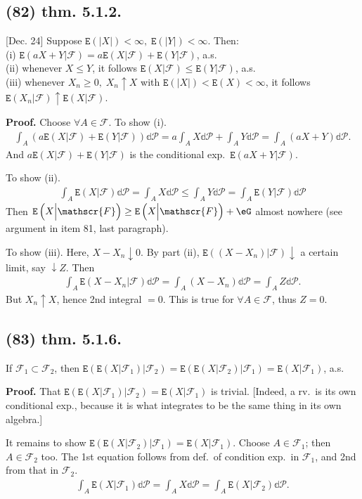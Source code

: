 \documentclass[12pt]{article}
\newcommand{\oo}\infty%
\newcommand{\Ev}\forall%
\newcommand{\dd}{ \BF{d} }%
\newcommand{\Rb}[1]{ \left( #1 \right) }%
\newcommand{\BF}[1]{ \mathbb{#1} }%
\newcommand{\CF}[1]{ \mathcal{#1} }%
\newcommand{\SF}[1]{ \mathscr{#1} }%
\newcommand{\Ss}[1]{\textsf{\bfseries{#1}}}%
\newcommand{\Tw}[1]{\texttt{#1}}%
\newcommand{\EqGo}[1]{ \begin{gather*}{#1}\end{gather*} } %
\newcommand{\E}[1]{ \Tw{E}\Rb{#1} }%
\begin{document}
\subsection*{(82) thm. 5.1.2.} [Dec. 24] Suppose \(\E{|X|} <\oo,\; \E{|Y|} <\oo\). Then: \\
\indent (i) \(\E{aX+Y  \Big| \SF{F}} =a \E{X \Big| \SF{F}} +\E{Y \Big| \SF{F}}\), a.s. \\
\indent (ii) whenever \(X \leq Y\), it follows \(\E{X \Big| \SF{F}} \leq \E{Y \Big| \SF{F}}\), a.s. \\
\indent (iii) whenever \(X_n \geq 0,\; X_n \uparrow X\) with \(\E{|X|} <\E{X} <\oo\), it follows \(\E{X_n \Big| \SF{F}} \uparrow \E{X \Big| \SF{F}}\). \par
\Ss{Proof.} Choose \(\Ev A \in \SF{F}\). To show (i). \EqGo{
 \int_A (a\E{X \Big| \SF{F}} +\E{Y \Big| \SF{F}}) \dd \CF{P}
 =a\int_A X \dd \CF{P} +\int_A Y \dd \CF{P}
 =\int_A (aX +Y) \dd \CF{P}.
} And \(a \E{X \Big| \SF{F}} +\E{Y \Big| \SF{F}}\) is the conditional exp.\ \(\E{aX+Y  \Big| \SF{F}}\). \par
To show (ii). \EqGo{
 \int_A \E{X \Big| \SF{F}} \dd \CF{P}
 =\int_A X \dd \CF{P}
 \leq\int_A Y \dd \CF{P}
 =\int_A \E{Y \Big| \SF{F}} \dd \CF{P}
} Then \(\E{X \Big| \SF{F}} \geq \E{X \Big| \SF{F}} +\eG\) almost nowhere (see argument in item 81, last paragraph). \par
To show (iii). Here, \(X-X_n \downarrow 0\). 
By part (ii), \(\E{(X-X_n) \Big| \SF{F}} \downarrow\) a certain limit, say \(\downarrow Z\). 
Then \EqGo{
 \int_A \E{X-X_n \Big| \SF{F}} \dd \CF{P}
 =\int_A (X-X_n) \dd \CF{P} 
 =\int_A Z \dd \CF{P}.
} But \(X_n \uparrow X\), hence 2nd integral \(=0\). 
This is true for \(\Ev A \in \SF{F}\), thus \(Z =0\). 

\subsection*{(83) thm. 5.1.6.} If \(\SF{F}_1 \subset \SF{F}_2\), then \(\E{\E{X \Big| \SF{F}_1} \Big| \SF{F}_2} =\E{\E{X \Big| \SF{F}_2} \Big| \SF{F}_1} =\E{X \Big| \SF{F}_1}\), a.s. \par
\Ss{Proof.} That \(\E{\E{X \Big| \SF{F}_1} \Big| \SF{F}_2} =\E{X \Big| \SF{F}_1}\) is trivial. 
[Indeed, a rv.\ is its own conditional exp., because it is what integrates to be the same thing in its own algebra.] \par
It remains to show \(\E{\E{X \Big| \SF{F}_2} \Big| \SF{F}_1} =\E{X \Big| \SF{F}_1}\). 
Choose \(A \in \SF{F}_1\); then \(A \in \SF{F}_2\) too. 
The 1st equation follows from def.\ of condition exp.\ in \(\SF{F}_1\), and 2nd from that in \(\SF{F}_2\). \EqGo{
 \int_A \E{X \Big| \SF{F}_1} \dd \CF{P}
 =\int_A X \dd \CF{P}
 =\int_A \E{X \Big| \SF{F}_2} \dd \CF{P}.
} 
\end{document}
